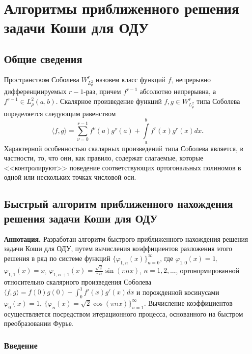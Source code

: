 
\chapter{Алгоритмы приближенного решения задачи Коши для ОДУ}

\section{Общие сведения}
Пространством Соболева $W^r_{L^{2}_\rho}$  назовем класс функций $f$, непрерывно дифференциируемых $r-1$-раз, причем $f^{r-1}$ абсолютно непрерывна, а $f^{r-1}\in L^2_\rho(a,b)$. Скалярное произведение функций $f,g\in W^r_{L^{2}_\rho}$ типа Соболева определяется следующим равенством
\begin{equation*}
  \langle f,g\rangle = \sum\limits_{\nu=0}^{r-1}f^\nu(a)g^\nu(a)+\int\limits_a^b f^r(x)g^r(x)dx.
\end{equation*}
Характерной особенностью скалярных  произведений типа Соболева является, в частности, то, что они, как правило,  содержат слагаемые, которые <<контролируют>> поведение соответствующих ортогональных полиномов в одной или нескольких точках числовой оси.


\section{Быстрый алгоритм приближенного нахождения решения задачи Коши для ОДУ}


\textbf{ Аннотация.} Разработан алгоритм быстрого приближенного нахождения решения задачи Коши для ОДУ, путем вычисления коэффициентов разложения этого решения в ряд по системе функций $\{\varphi_{1,n}(x)\}_{n=0}^{\infty}$, где $ \varphi_{1,0}(x)=1$, $\varphi_{1,1}(x)=x$, $\varphi_{1,n+1}(x)=\frac{\sqrt{2}}{\pi n}\sin(\pi nx)$, $n=1,2,\ldots$,
ортонормированной относительно скалярного произведения Соболева $\langle f, g\rangle=f(0)g(0)+\int_0^1f'(x)g'(x)dx$ и порожденной
косинусами $\varphi_0(x)=1,\ \{\varphi_n(x)=\sqrt{2}\cos(\pi nx)\}_{n=1}^\infty$.
Вычисление коэффициентов осуществляется посредством итерационного процесса, основанного на быстром преобразовании Фурье.


\subsection{Введение}

